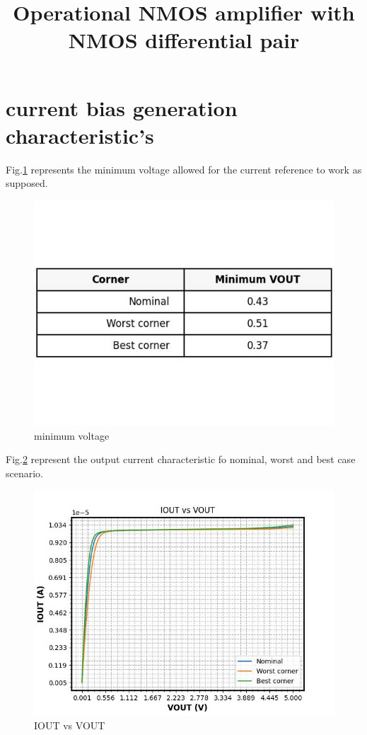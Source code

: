 \documentclass{article}
\begin{document}
\title{Operational NMOS amplifier with NMOS differential pair}
\maketitle

\section{current bias generation characteristic's}

Fig.\ref{fig:values} represents the minimum voltage allowed for the current reference to work as supposed.

\begin{figure}[H] %
    \centering
    \includegraphics[width=.7\textwidth]{./interception_table.jpg} %
    \caption{minimum voltage}
    \label{fig:values}
\end{figure}




Fig.\ref{fig:iout_vs_vout} represent the output current characteristic fo nominal, worst and best case scenario.

\begin{figure}[H] %
    \centering
    \includegraphics[width=.7\textwidth]{./IOUT_vs_VOUT.jpg} %
    \caption{IOUT vs VOUT}
    \label{fig:iout_vs_vout}
\end{figure}
\end{document}
